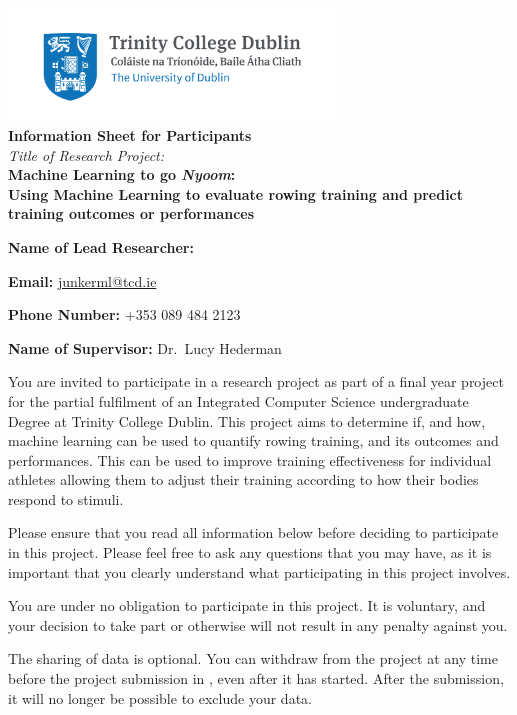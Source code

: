 \begin{center}
    \includegraphics[height=3cm]{info-sheet/Trinity_RGB_transparent_main.png}\\
    {\large\textbf{Information Sheet for Participants}}\\
    \textit{Title of Research Project:}\\
    \textbf{Machine Learning to go \emph{Nyoom}:}\\
    \textbf{Using Machine Learning to evaluate rowing training and predict training outcomes or performances}
\end{center}

\vspace{1cm}

\textbf{Name of Lead Researcher:} \authorname

\textbf{Email:} \href{mailto:junkerml@tcd.ie}{junkerml@tcd.ie}

\textbf{Phone Number:} +353 089 484 2123

\textbf{Name of Supervisor:} Dr.~Lucy Hederman

\vspace{1cm}

You are invited to participate in a research project as part of a final year project for the partial fulfilment of an Integrated Computer Science undergraduate Degree at Trinity College Dublin. This project aims to determine if, and how, machine learning can be used to quantify rowing training, and its outcomes and performances. This can be used to improve training effectiveness for individual athletes allowing them to adjust their training according to how their bodies respond to stimuli.

Please ensure that you read all information below before deciding to participate in this project. Please feel free to ask any questions that you may have, as it is important that you clearly understand what participating in this project involves.

You are under no obligation to participate in this project. It is voluntary, and your decision to take part or otherwise will not result in any penalty against you.

The sharing of data is optional. You can withdraw from the project at any time before the project submission in \deadline, even after it has started. After the submission, it will no longer be possible to exclude your data.

